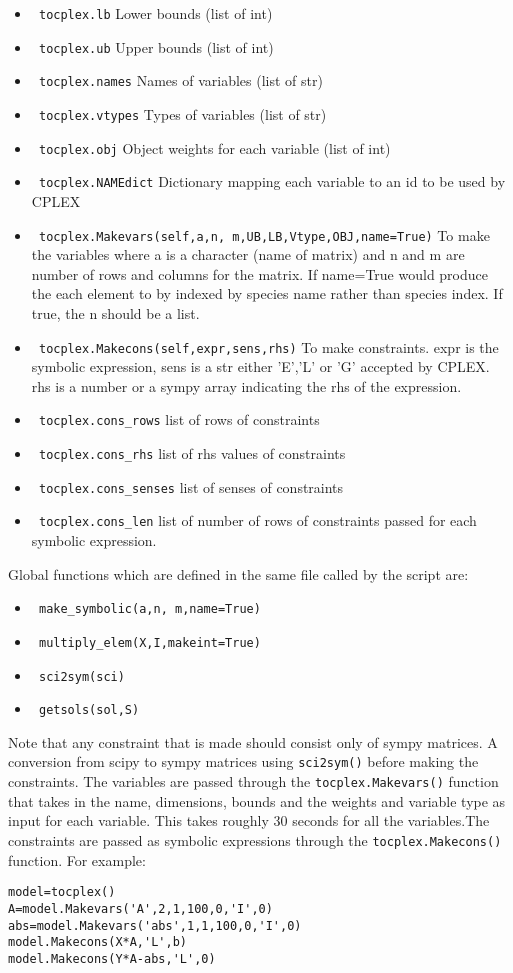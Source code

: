 \documentclass[
10pt, %
letter, %
oneside, %
BCOR02mm, %
]{scrartcl}
\begin{document}
\begin{itemize}
\item \verb; tocplex.lb; Lower bounds (list of int)
\item \verb; tocplex.ub; Upper bounds (list of int)
\item \verb; tocplex.names; Names of variables (list of str)
\item \verb; tocplex.vtypes; Types of variables (list of str)
\item \verb; tocplex.obj; Object weights for each variable (list of int)
\item \verb; tocplex.NAMEdict; Dictionary mapping each variable to an id to be used by CPLEX 
\item \verb; tocplex.Makevars(self,a,n, m,UB,LB,Vtype,OBJ,name=True); To make the variables where a is a character (name of matrix) and n and m are number of rows and columns for the matrix. If name=True would produce the each element to by indexed by species name rather than species index. If true, the n should be a list. 
\item \verb; tocplex.Makecons(self,expr,sens,rhs); To make constraints. expr is the symbolic expression, sens is a str either 'E','L' or 'G' accepted by CPLEX. rhs is a number or a sympy array indicating the rhs of the expression. 
\item \verb; tocplex.cons_rows; list of rows of constraints
\item \verb; tocplex.cons_rhs; list of rhs values of constraints
\item \verb; tocplex.cons_senses; list of senses of constraints
\item \verb; tocplex.cons_len; list of number of rows of constraints passed for each symbolic expression. 
\end{itemize}

Global functions which are defined in the same file called by the script are:
\begin{itemize}
\item  \verb; make_symbolic(a,n, m,name=True);
\item  \verb; multiply_elem(X,I,makeint=True);
\item \verb; sci2sym(sci);
\item \verb; getsols(sol,S);
\end{itemize}



Note that any constraint that is made should consist only of sympy matrices. A conversion from scipy to sympy matrices using \verb;sci2sym(); before making the constraints. %
The variables are passed through the \verb;tocplex.Makevars(); function that takes in the name, dimensions, bounds and the weights and variable type as input for each variable. This takes roughly 30 seconds for all the variables.The constraints are passed as symbolic expressions through the \verb;tocplex.Makecons(); function.  For example:
\begin{verbatim}
model=tocplex()
A=model.Makevars('A',2,1,100,0,'I',0)
abs=model.Makevars('abs',1,1,100,0,'I',0)
model.Makecons(X*A,'L',b)
model.Makecons(Y*A-abs,'L',0)
\end{verbatim}
\end{document}
